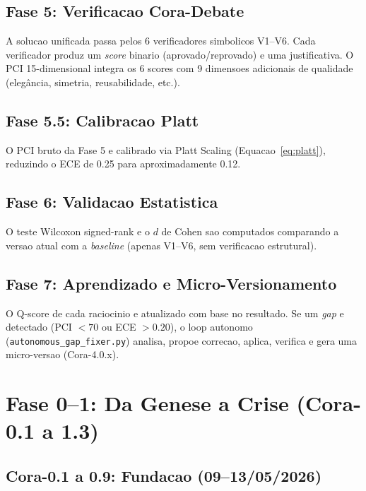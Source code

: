 \documentclass[5p]{elsarticle}
\begin{document}
\subsection{Fase 5: Verificacao Cora-Debate}

A solucao unificada passa pelos 6 verificadores simbolicos V1--V6. Cada
verificador produz um \textit{score} binario (aprovado/reprovado) e uma
justificativa. O PCI 15-dimensional integra os 6 scores com 9 dimensoes
adicionais de qualidade (elegância, simetria, reusabilidade, etc.).

\subsection{Fase 5.5: Calibracao Platt}

O PCI bruto da Fase 5 e calibrado via Platt Scaling (Equacao~\ref{eq:platt}),
reduzindo o ECE de 0.25 para aproximadamente 0.12.

\subsection{Fase 6: Validacao Estatistica}

O teste Wilcoxon signed-rank \cite{wilcoxon1945} e o $d$ de Cohen \cite{cohen1988}
sao computados comparando a versao atual com a \textit{baseline} (apenas V1--V6,
sem verificacao estrutural).

\subsection{Fase 7: Aprendizado e Micro-Versionamento}

O Q-score de cada raciocinio e atualizado com base no resultado. Se um \textit{gap}
e detectado (PCI $< 70$ ou ECE $> 0.20$), o loop autonomo (\texttt{autonomous\_gap\_fixer.py})
analisa, propoe correcao, aplica, verifica e gera uma micro-versao (Cora-4.0.x).

\section{Fase 0--1: Da Genese a Crise (Cora-0.1 a 1.3)}

\subsection{Cora-0.1 a 0.9: Fundacao (09--13/05/2026)}
\end{document}
